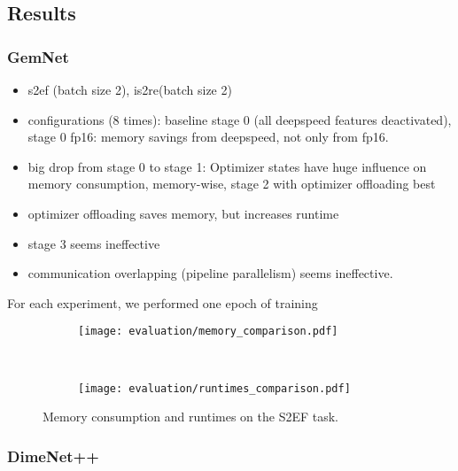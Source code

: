 \subsection{Results}

\subsubsection{GemNet}

\begin{itemize}
    \item s2ef (batch size 2), is2re(batch size 2)
    \item configurations (8 times): baseline stage 0 (all deepspeed features deactivated), 
    stage 0 fp16: memory savings from deepspeed, not only from fp16. 
    \item big drop from stage 0 to stage 1: Optimizer states have huge influence on
    memory consumption, memory-wise, stage 2 with optimizer offloading best
    \item optimizer offloading saves memory, but increases runtime
    \item stage 3 seems ineffective
    \item communication overlapping (pipeline parallelism) seems ineffective.
\end{itemize}

For each experiment, we performed one epoch of training

\begin{figure}[H]
    \centering

    \begin{subfigure}[t]{0.48\textwidth}
        \centering
        \texttt{[image: evaluation/memory\_comparison.pdf]}
        \label{fig:gemnet-memory-results}
    \end{subfigure}%
    ~
    \begin{subfigure}[t]{0.48\textwidth}
        \centering
        \texttt{[image: evaluation/runtimes\_comparison.pdf]}
        \label{gemnet-runtimes-results}
    \end{subfigure}
    \vspace*{-1.5em}
    \caption{Memory consumption and runtimes on the S2EF task.}
    
\end{figure}

\subsubsection{DimeNet++}
